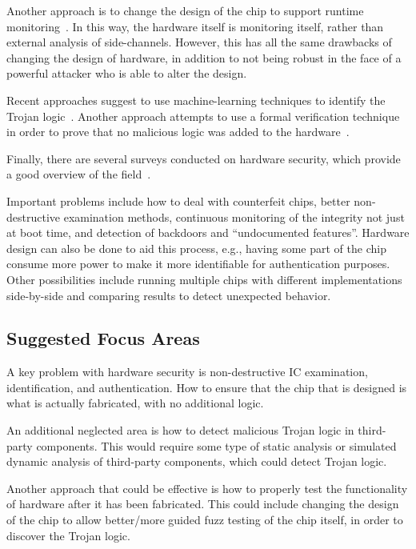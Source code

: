 \documentclass[11pt,letterpaper]{article}
\begin{document}
Another approach is to change the design of the chip to support
runtime monitoring~\cite{Waksman2010}. In this way, the hardware
itself is monitoring itself, 
rather than external analysis of
side-channels. However, this has all the same drawbacks of changing
the design of hardware, in addition to not being robust in the face of
a powerful attacker who is able to alter the design. 

Recent approaches suggest to use machine-learning techniques to
identify the Trojan logic~\cite{Haider2015}. Another approach attempts
to use a formal verification technique in order to prove that no
malicious logic was added to the hardware~\cite{Guo2015}.

Finally, there are several surveys conducted on hardware security,
which provide a good overview of the field~\cite{Wang2008,
  Tehranipoor2010, Guin2014, Guin2014a, Guin2014b}.

Important problems include how to deal with counterfeit chips, better
non-destructive examination methods, continuous monitoring of the
integrity not just at boot time, and detection of backdoors and 
``undocumented features''.  Hardware design can also be done to
aid this process, e.g., having some part of the chip consume more power
to make it more identifiable for authentication purposes.  Other
possibilities include running multiple chips with different
implementations side-by-side and comparing results to detect unexpected
behavior.

\subsection{Suggested Focus Areas}

A key problem with hardware security is non-destructive IC
examination, identification, and authentication. How to ensure that
the chip that is designed is what is actually fabricated, with no
additional logic.

An additional neglected area is how to detect malicious Trojan logic
in third-party components. This would require some type of static
analysis or simulated dynamic analysis of third-party components,
which could detect Trojan logic.

Another approach that could be effective is how to properly test the
functionality of hardware after it has been fabricated. This could
include changing the design of the chip to allow better/more guided
fuzz testing of the chip itself, in order to discover the Trojan
logic.
\end{document}
